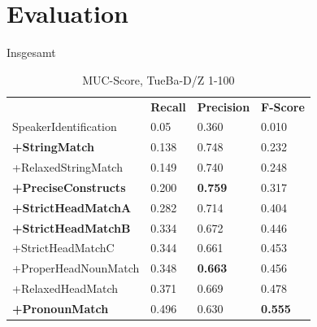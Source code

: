 \documentclass[11pt,a4paper]{beamer}
\begin{document}
\section{Evaluation}
\begin{frame}{Insgesamt}
\begin{table}[h]
\begin{tabular}{llll}
                            & \textbf{Recall} & \textbf{Precision} & \textbf{F-Score} \\
SpeakerIdentification       & 0.05            & 0.360              & 0.010            \\
\textbf{+StringMatch}       & 0.138           & 0.748              & 0.232            \\
+RelaxedStringMatch         & 0.149           & 0.740              & 0.248            \\
\textbf{+PreciseConstructs} & 0.200           & \textbf{0.759}     & 0.317            \\
\textbf{+StrictHeadMatchA}  & 0.282           & 0.714              & 0.404            \\
\textbf{+StrictHeadMatchB}  & 0.334           & 0.672              & 0.446            \\
+StrictHeadMatchC           & 0.344           & 0.661              & 0.453            \\
+ProperHeadNounMatch        & 0.348           & \textbf{0.663}     & 0.456            \\
+RelaxedHeadMatch           & 0.371           & 0.669              & 0.478            \\
\textbf{+PronounMatch}      & 0.496           & 0.630              & \textbf{0.555}       
\end{tabular}
\caption{MUC-Score, TueBa-D/Z 1-100}
\end{table}
\end{frame}
\end{document}
